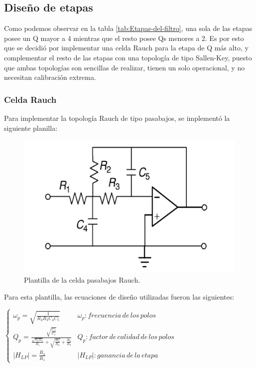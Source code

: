 \documentclass[../../ASSD_TP1_G7.tex]{subfiles}
\begin{document}
\subsection{Diseño de etapas}

Como podemos observar en la tabla \ref{tab:Etapas-del-filtro}, una
sola de las etapas posee un Q mayor a 4 mientras que el resto posee
Qs menores a 2. Es por esto que se decidió por implementar una celda
Rauch para la etapa de Q más alto, y complementar el resto de las
etapas con una topología de tipo Sallen-Key, puesto que ambas topologías
son sencillas de realizar, tienen un solo operacional, y no necesitan
calibración extrema.

\subsubsection{Celda Rauch}

Para implementar la topología Rauch de tipo pasabajos, se implementó
la siguiente planilla:
\begin{figure}[H]
\begin{centering}
\includegraphics[scale=0.7]{Imagenes/rauch.PNG}\caption{Plantilla de la celda pasabajos Rauch.}
\par\end{centering}
\end{figure}


Para esta plantilla, las ecuaciones de diseño utilizadas fueron las
siguientes:

$\begin{cases}
\omega_{p}=\sqrt{\frac{1}{R_{2}R_{3}C_{4}C_{5}}} & \omega_{p}:frecuencia\,de\,los\,polos\\
Q_{p}=\frac{\sqrt{\frac{C_{4}}{C_{5}}}}{\frac{\sqrt{R_{2}R_{3}}}{R_{1}}+\sqrt{\frac{R_{3}}{R_{2}}}+\frac{R_{2}}{R_{3}}} & Q_{p}:factor\,de\,calidad\,de\,los\,polos\\
|H_{LP}|=\frac{R_{3}}{R_{1}} & |H_{LP}|:ganancia\,de\,la\,etapa
\end{cases}$
\end{document}
